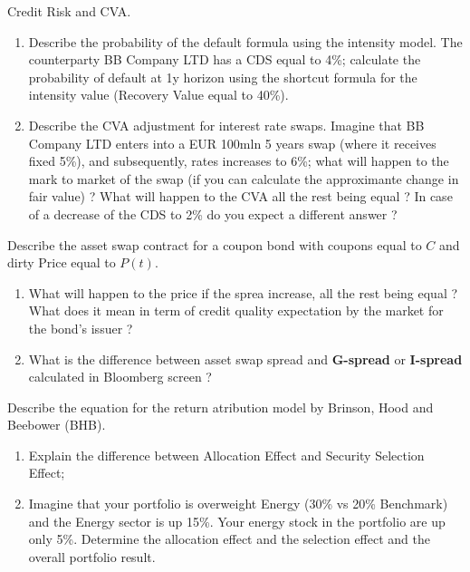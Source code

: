 \documentclass[12pt,a4paper]{exam}
\begin{document}
\begin{questions}

\question 
Credit Risk and CVA.
\begin{enumerate}
\item Describe the probability of the default formula using the intensity model. The counterparty BB Company LTD has a CDS equal to 4\%; calculate the probability of default at 1y horizon using the shortcut formula for the intensity value (Recovery Value equal to 40\%).	
\item Describe the CVA adjustment for interest rate swaps. Imagine that BB Company LTD enters into a EUR 100mln 5 years swap (where it receives fixed 5\%), and subsequently, rates increases to 6\%; what will happen to the mark to market of the swap (if you can calculate the approximante change in fair value) ? What will happen to the CVA all the rest being equal ? In case of a decrease of the CDS to 2\% do you expect a different answer ?\end{enumerate}
\fillwithlines{3cm}
\begin{solution}
\end{solution}

\question Describe the asset swap contract for a coupon bond with coupons equal to $C$ and dirty Price equal to $P(t)$.
\begin{enumerate}
\item What will happen to the price if the sprea increase, all the rest being equal ? What does it mean in term of credit quality expectation by the market for the bond's issuer ?
\item What is the difference between asset swap spread and \textbf{G-spread} or \textbf{I-spread} calculated in Bloomberg screen ?
\end{enumerate}
\fillwithlines{3cm}
\begin{solution}
\end{solution}

\question Describe the equation for the return atribution model by Brinson, Hood and Beebower (BHB).
\begin{enumerate}[label=(\alph*)]
\item Explain the difference between Allocation Effect and Security Selection Effect;
\item Imagine that your portfolio is overweight Energy (30\% vs 20\% Benchmark) and the Energy sector is up 15\%. Your energy stock in the portfolio are up only 5\%. Determine the allocation effect and the selection effect and the overall portfolio result.
\end{enumerate}
\fillwithlines{3cm}
\begin{solution}
\end{solution}


\end{questions}
\end{document}
